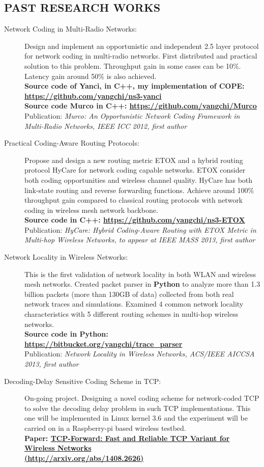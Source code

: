 \documentclass[line]{res}
\begin{document}
\begin{resume}
	\section{PAST RESEARCH WORKS}
	\begin{description}
		\item[Network Coding in Multi-Radio Networks:] 
			Design and implement an opportunistic and independent 2.5 layer protocol for network coding in multi-radio networks. First distributed and practical solution to this problem. Throughput gain in some cases can be 10\%. Latency gain around 50\% is also achieved. \\
			\textbf{Source code of Yanci, in C++, my implementation of COPE: \url{https://github.com/yangchi/ns3-yanci}} \\
			\textbf{Source code Murco in C++: \url{https://github.com/yangchi/Murco}} \\
			Publication: \emph{Murco: An Opportunistic Network Coding Framework in Multi-Radio Networks, IEEE ICC 2012, first author}
		\item[Practical Coding-Aware Routing Protocols:] 
			Propose and design a new routing metric ETOX and a hybrid routing protocol HyCare for network coding capable networks. ETOX consider both coding opportunities and wireless channel quality. HyCare has both link-state routing and reverse forwarding functions. Achieve around 100\% throughput gain compared to classical routing protocols with network coding in wireless mesh network backbone.\\
			\textbf{Source code in C++: \url{https://github.com/yangchi/ns3-ETOX} } \\
			Publication: \emph{HyCare: Hybrid Coding-Aware Routing with ETOX Metric in Multi-hop Wireless Networks, to appear at IEEE MASS 2013, first author}
		\item[Network Locality in Wireless Networks:] 
			This is the first validation of network locality in both WLAN and wireless mesh networks. Created packet parser in \textbf{Python} to analyze more than 1.3 billion packets (more than 130GB of data) collected from both real network traces and simulations. Examined 4 common network locality characteristics with 5 different routing schemes in multi-hop wireless networks.\\
			\textbf{Source code in Python: \url{https://bitbucket.org/yangchi/trace_parser} } \\
			Publication: \emph{Network Locality in Wireless Networks, ACS/IEEE AICCSA 2013, first author}
		\item [Decoding-Delay Sensitive Coding Scheme in TCP:]
			On-going project. Designing a novel coding scheme for network-coded TCP to solve the decoding delay problem in such TCP implementations. This one will be implemented in Linux kernel 3.6 and the experiment will be carried on in a Raspberry-pi based wireless testbed. \\
			\textbf{Paper: \href{http://arxiv.org/abs/1408.2626}{TCP-Forward: Fast and Reliable TCP Variant for Wireless Networks  \\ (http://arxiv.org/abs/1408.2626)}}
	\end{description}
	

\end{resume}
\end{document}
